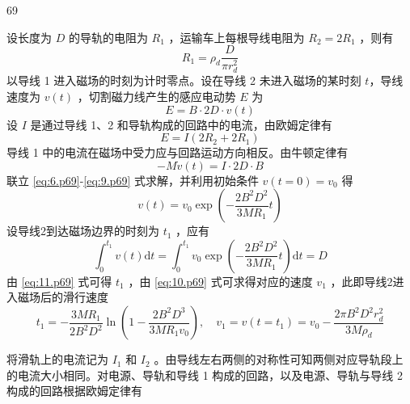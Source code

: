 \begin{solution}{69}
\begin{subsolution}
        设长度为 $D$ 的导轨的电阻为 $R_{1}$ ，运输车上每根导线电阻为 $R_{2}=2R_{1}$ ，则有
        \begin{equation}
            R_{1} = \rho_{d} \frac{D}{\pi r_{d}^{2}} \label{eq:6.p69}
        \end{equation}
        以导线 1 进入磁场的时刻为计时零点。设在导线 2 未进入磁场的某时刻 $t$，导线速度为 $v(t)$ ，切割磁力线产生的感应电动势 $E$ 为
        \begin{equation}
            E = B \cdot 2D \cdot v(t) \label{eq:7.p69}
        \end{equation}
        设 $I$ 是通过导线 1、2 和导轨构成的回路中的电流，由欧姆定律有
        \begin{equation}
            E = I (2R_{2} + 2R_{1}) \label{eq:8.p69}
        \end{equation}
        导线 1 中的电流在磁场中受力应与回路运动方向相反。由牛顿定律有
        \begin{equation}
            -M \dot{v}(t) = I \cdot 2D \cdot B \label{eq:9.p69}
        \end{equation}
        联立 \eqref{eq:6.p69}-\eqref{eq:9.p69} 式求解，并利用初始条件 $v(t=0)=v_{0}$ 得
        \begin{equation}
            v(t) = v_{0} \exp\left( -\frac{2B^{2} D^{2}}{3M R_{1}} t \right) \label{eq:10.p69}
        \end{equation}
        设导线2到达磁场边界的时刻为 $t_{1}$ ，应有
        \begin{equation}
            \int_{0}^{t_{1}} v(t) \mathrm{d}t = \int_{0}^{t_{1}} v_{0} \exp\left( -\frac{2B^{2} D^{2}}{3M R_{1}} t \right) \mathrm{d}t = D \label{eq:11.p69}
        \end{equation}
        由 \eqref{eq:11.p69} 式可得 $t_{1}$ ，由 \eqref{eq:10.p69} 式可求得对应的速度 $v_{1}$ ，此即导线2进入磁场后的滑行速度
        \begin{equation}
            t_{1} = -\frac{3M R_{1}}{2B^{2} D^{2}} \ln\left( 1 - \frac{2B^{2} D^{3}}{3M R_{1} v_{0}} \right), \quad v_{1} = v(t=t_{1}) = v_{0} - \frac{2\pi B^{2} D^{2} r_{d}^{2}}{3M \rho_{d}} \label{eq:12.p69}
        \end{equation}
    \end{subsolution}
    \begin{subsolution}
        将滑轨上的电流记为 $I_{1}$ 和 $I_{2}$ 。由导线左右两侧的对称性可知两侧对应导轨段上的电流大小相同。对电源、导轨和导线 1 构成的回路，以及电源、导轨与导线 2 构成的回路根据欧姆定律有
        \begin{equation}

\end{equation}
\end{subsolution}
\end{solution}
